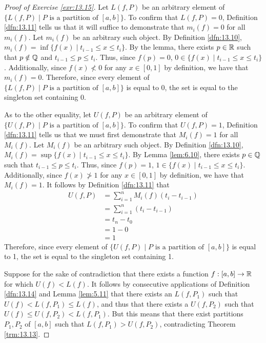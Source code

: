 \documentclass[../main.tex]{subfiles}
\begin{document}
\begin{exercise}
\begin{proof}[Proof of Exercise \ref{exr:13.15}]
        Let $L(f,P)$ be an arbitrary element of $\{L(f,P)\mid P\text{ is a partition of }[a,b]\}$. To confirm that $L(f,P)=0$, Definition \ref{dfn:13.11} tells us that it will suffice to demonstrate that $m_i(f)=0$ for all $m_i(f)$. Let $m_i(f)$ be an arbitrary such object. By Definition \ref{dfn:13.10}, $m_i(f)=\inf\{f(x)\mid t_{i-1}\leq x\leq t_i\}$. By the lemma, there exists $p\in\mathbb{R}$ such that $p\notin\mathbb{Q}$ and $t_{i-1}\leq p\leq t_i$. Thus, since $f(p)=0$, $0\in\{f(x)\mid t_{i-1}\leq x\leq t_i\}$. Additionally, since $f(x)\not<0$ for any $x\in[0,1]$ by definition, we have that $m_i(f)=0$. Therefore, since every element of $\{L(f,P)\mid P\text{ is a partition of }[a,b]\}$ is equal to 0, the set is equal to the singleton set containing 0.\par
        As to the other equality, let $U(f,P)$ be an arbitrary element of $\{U(f,P)\mid P\text{ is a partition of }[a,b]\}$. To confirm that $U(f,P)=1$, Definition \ref{dfn:13.11} tells us that we must first demonstrate that $M_i(f)=1$ for all $M_i(f)$. Let $M_i(f)$ be an arbitrary such object. By Definition \ref{dfn:13.10}, $M_i(f)=\sup\{f(x)\mid t_{i-1}\leq x\leq t_i\}$. By Lemma \ref{lem:6.10}, there exists $p\in\mathbb{Q}$ such that $t_{i-1}\leq p\leq t_i$. Thus, since $f(p)=1$, $1\in\{f(x)\mid t_{i-1}\leq x\leq t_i\}$. Additionally, since $f(x)\not>1$ for any $x\in[0,1]$ by definition, we have that $M_i(f)=1$. It follows by Definition \ref{dfn:13.11} that
        \begin{align*}
            U(f,P) &= \sum_{i=1}^nM_i(f)(t_i-t_{i-1})\\
            &= \sum_{i=1}^n(t_i-t_{i-1})\\
            &= t_n-t_0\\
            &= 1-0\\
            &= 1
        \end{align*}
        Therefore, since every element of $\{U(f,P)\mid P\text{ is a partition of }[a,b]\}$ is equal to 1, the set is equal to the singleton set containing 1.\par\medskip
        Suppose for the sake of contradiction that there exists a function $f:[a,b]\to\mathbb{R}$ for which $U(f)<L(f)$. It follows by consecutive applications of Definition \ref{dfn:13.14} and Lemma \ref{lem:5.11} that there exists an $L(f,P_1)$ such that $U(f)<L(f,P_1)\leq L(f)$, and thus that there exists a $U(f,P_2)$ such that $U(f)\leq U(f,P_2)<L(f,P_1)$. But this means that there exist partitions $P_1,P_2$ of $[a,b]$ such that $L(f,P_1)>U(f,P_2)$, contradicting Theorem \ref{trm:13.13}.
    \end{proof}
\end{exercise}
\end{document}
